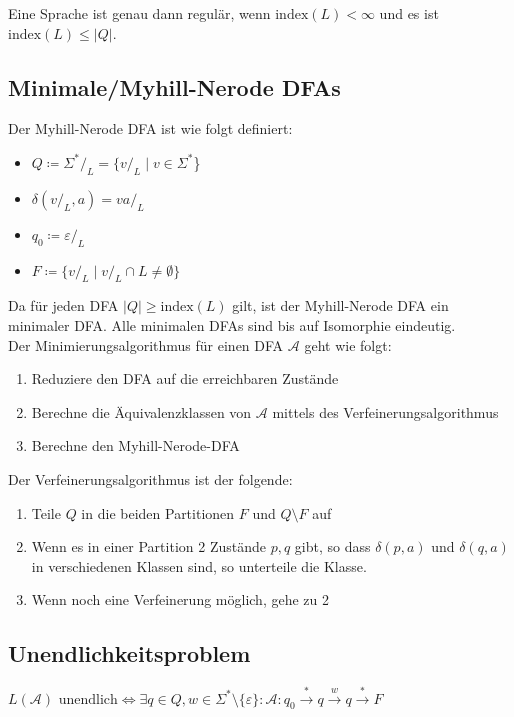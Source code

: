 \documentclass[11pt]{scrartcl}
\begin{document}
Eine Sprache ist genau dann regulär, wenn $\textrm{index}(L) < \infty$ und es ist $\textrm{index}(L) \leq \vert Q\vert$.

\subsection{Minimale/Myhill-Nerode DFAs}
Der Myhill-Nerode DFA ist wie folgt definiert:
\begin{itemize}
	\item{$Q \coloneqq \Sigma^*/_L = \{v/_L\mid v \in \Sigma^*$\}}
	\item{$\delta(v/_L, a) = va/_L$}
	\item{$q_0 \coloneqq \varepsilon/_L$}
	\item{$F \coloneqq \{v/_L \mid v/_L \cap L \neq \emptyset\}$}
\end{itemize}

Da für jeden DFA $\mid Q\mid \geq \textrm{index}(L)$ gilt, ist der Myhill-Nerode DFA ein minimaler DFA. Alle minimalen DFAs sind bis auf Isomorphie eindeutig. \\

Der Minimierungsalgorithmus für einen DFA $\mathcal{A}$ geht wie folgt:
\begin{enumerate}
	\item{Reduziere den DFA auf die erreichbaren Zustände}
	\item{Berechne die Äquivalenzklassen von $\mathcal{A}$ mittels des Verfeinerungsalgorithmus}
	\item{Berechne den Myhill-Nerode-DFA}
\end{enumerate}

Der Verfeinerungsalgorithmus ist der folgende:
\begin{enumerate}
	\item{Teile $Q$ in die beiden Partitionen $F$ und $Q\setminus F$ auf}
	\item{Wenn es in einer Partition 2 Zustände $p,q$ gibt, so dass $\delta(p,a)$ und $\delta(q,a)$ in verschiedenen Klassen sind, so unterteile die Klasse.}
	\item{Wenn noch eine Verfeinerung möglich, gehe zu 2}
\end{enumerate}

\subsection{Unendlichkeitsproblem}
$L(\mathcal{A}) \text{ unendlich} \Leftrightarrow \exists q \in Q, w \in \Sigma^*\setminus \{\varepsilon\}: \mathcal{A}:  q_0 \stackrel{\ast}{\rightarrow} q \stackrel{w}{\rightarrow} q \stackrel{\ast}{\rightarrow}F$
\end{document}
